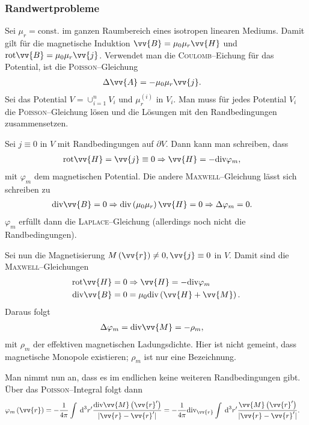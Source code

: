 \documentclass[a4paper,12pt]{article}
\newcommand{\td}{\,\text{d}}
\numberwithin{equation}{section}
\begin{document}
\subsubsection{Randwertprobleme}
Sei $\mu _r=\text{const.}$ im ganzen Raumbereich eines isotropen linearen Mediums.
Damit gilt für die magnetische Induktion $\vv{B}=\mu _0\mu _r\vv{H}$ und $\text{rot}\vv{B}=\mu _0\mu _r\vv{j}$.
Verwendet man die \textsc{Coulomb}--Eichung für das Potential, ist die \textsc{Poisson}--Gleichung
\begin{align} 
        \Delta \vv{A}&=-\mu _0\mu _r\vv{j}
.\end{align} 
Sei das Potential $V=\cup _{i=1}^nV_i$ und $\mu _r^{\left(i\right)}$ in $V_i$. 
Man muss für jedes Potential $V_i$ die \textsc{Poisson}--Gleichung lösen und die Lösungen mit den Randbedingungen zusammensetzen.\par
Sei $j\equiv 0$ in $V$ mit Randbedingungen auf $\partial V$. 
Dann kann man schreiben, dass
\begin{align} 
        \text{rot}\vv{H}&=\vv{j}\equiv0\Rightarrow \vv{H}=-\text{div}\varphi _m
,\end{align} 
mit $\varphi _m$ dem magnetischen Potential.
Die andere \textsc{Maxwell}--Gleichung lässt sich schreiben zu
\begin{align} 
        \text{div}\vv{B}&=0\Rightarrow \text{div}\left(\mu _0\mu _r\right)\vv{H}=0\Rightarrow \Delta \varphi _m=0
.\end{align} 
$\varphi _m$ erfüllt dann die \textsc{Laplace}--Gleichung (allerdings noch nicht die Randbedingungen).\par
Sei nun die Magnetisierung $M\left(\vv{r}\right)\neq 0,\vv{j}\equiv0 $ in $V$. Damit sind die \textsc{Maxwell}--Gleichungen
\begin{align} 
        \text{rot}\vv{H}&=0\Rightarrow \vv{H}=-\text{div}\varphi _m\\
        \text{div}\vv{B}&=0=\mu _0\text{div}\left(\vv{H}+\vv{M}\right)
.\end{align} 
Daraus folgt
\begin{align} 
        \Delta \varphi _m&=\text{div}\vv{M}=-\rho _m
,\end{align} 
mit $\rho _m$ der effektiven magnetischen Ladungsdichte. 
Hier ist nicht gemeint, dass magnetische Monopole existieren; $\rho _m$ ist nur eine Bezeichnung.\par
Man nimmt nun an, dass es im endlichen keine weiteren Randbedingungen gibt.
Über das \textsc{Poisson}--Integral folgt dann
\begin{align} 
        \varphi _m\left(\vv{r}\right)&=-\dfrac{1}{4\pi }\int_{}^{}\td ^3r'\dfrac{\text{div}\vv{M}\left(\vv{r}'\right)}{|\vv{r}-\vv{r}'|}=-\dfrac{1}{4\pi }\text{div}_{\vv{r}}\int_{}^{}\td ^3r'\dfrac{\vv{M}\left(\vv{r}'\right)}{|\vv{r}-\vv{r}'|}
.\end{align} 
\end{document}
